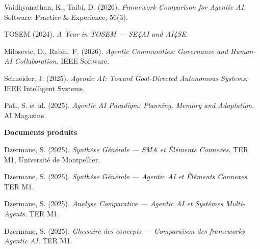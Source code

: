 \documentclass[12pt,a4paper]{report}
\begin{document}
\begin{description}[leftmargin=0pt, itemsep=4pt]
\item Vaidhyanathan, K., Taibi, D. (2026). \textit{Framework Comparison for Agentic AI}. Software: Practice \& Experience, 56(3).

\item TOSEM (2024). \textit{A Year in TOSEM --- SE4AI and AI4SE}.

\item Milosevic, D., Rabhi, F. (2026). \textit{Agentic Communities: Governance and Human-AI Collaboration}. IEEE Software.

\item Schneider, J. (2025). \textit{Agentic AI: Toward Goal-Directed Autonomous Systems}. IEEE Intelligent Systems.

\item Pati, S. et al. (2025). \textit{Agentic AI Paradigm: Planning, Memory and Adaptation}. AI Magazine.

\medskip
\item \textbf{Documents produits}

\item Dzermane, S. (2025). \textit{Synthèse Générale --- SMA et Éléments Connexes}. TER M1, Université de Montpellier.

\item Dzermane, S. (2025). \textit{Synthèse Générale --- Agentic AI et Éléments Connexes}. TER M1.

\item Dzermane, S. (2025). \textit{Analyse Comparative --- Agentic AI et Systèmes Multi-Agents}. TER M1.

\item Dzermane, S. (2025). \textit{Glossaire des concepts --- Comparaison des frameworks Agentic AI}. TER M1.

\end{description}
\end{document}
